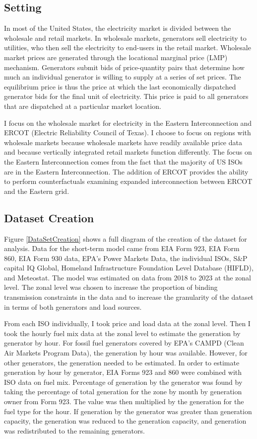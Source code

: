 \documentclass[12pt]{article}
\begin{document}
\subsection{Setting}
In most of the United States, the electricity market is divided between the wholesale and retail markets. In wholesale markets, generators sell electricity to utilities, who then sell the electricity to end-users in the retail market. Wholesale market prices are generated through the locational marginal price (LMP) mechanism. Generators submit bids of price-quantity pairs that determine how much an individual generator is willing to supply at a series of set prices. The equilibrium price is thus the price at which the last economically dispatched generator bids for the final unit of electricity. This price is paid to all generators that are dispatched at a particular market location.

I focus on the wholesale market for electricity in the Eastern Interconnection and ERCOT (Electric Reliability Council of Texas). I choose to focus on regions with wholesale markets because wholesale markets have readily available price data and because vertically integrated retail markets function differently. The focus on the Eastern Interconnection comes from the fact that the majority of US ISOs are in the Eastern Interconnection. The addition of ERCOT provides the ability to perform counterfactuals examining expanded interconnection between ERCOT and the Eastern grid.

\subsection{Dataset Creation}

Figure \ref{DataSetCreation} shows a full diagram of the creation of the dataset for analysis. Data for the short-term model came from EIA Form 923, EIA Form 860, EIA Form 930 data, EPA's Power Markets Data, the individual ISOs, S\&P capital IQ Global, Homeland Infrastructure Foundation Level Database (HIFLD), and Meteostat. The model was estimated on data from 2018 to 2023 at the zonal level. The zonal level was chosen to increase the proportion of binding transmission constraints in the data and to increase the granularity of the dataset in terms of both generators and load sources.

From each ISO individually, I took price and load data at the zonal level. Then I took the hourly fuel mix data at the zonal level to estimate the generation by generator by hour. For fossil fuel generators covered by EPA's CAMPD (Clean Air Markets Program Data), the generation by hour was available. However, for other generators, the generation needed to be estimated. In order to estimate generation by hour by generator, EIA Forms 923 and 860 were combined with ISO data on fuel mix. Percentage of generation by the generator was found by taking the percentage of total generation for the zone by month by generation owner from Form 923. The value was then multiplied by the generation for the fuel type for the hour. If generation by the generator was greater than generation capacity, the generation was reduced to the generation capacity, and generation was redistributed to the remaining generators.
\end{document}
